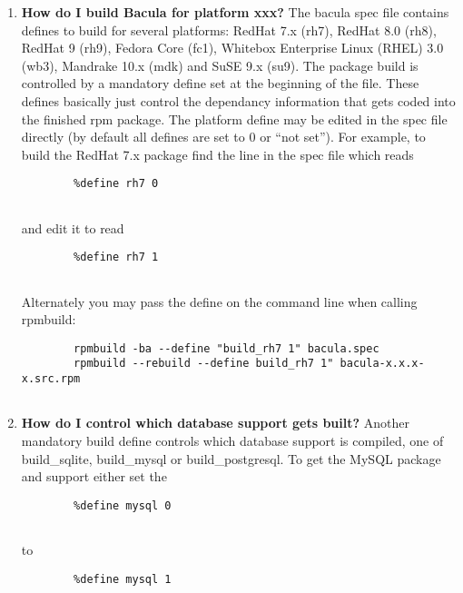\begin{enumerate}
\item 
   \label{faq1}
   {\bf How do I build Bacula for platform xxx?}
The bacula spec file contains defines to build for several platforms:  RedHat
7.x (rh7), RedHat 8.0 (rh8), RedHat 9 (rh9), Fedora Core (fc1),  Whitebox
Enterprise Linux (RHEL) 3.0 (wb3), Mandrake 10.x (mdk) and SuSE 9.x (su9). 
The package build is controlled by a mandatory define set at the beginning of 
the file. These defines basically just control the dependancy information that
 gets coded into the finished rpm package. 
The platform define may be edited in the spec file directly (by default all 
defines are set to 0 or ``not set''). For example, to build the RedHat 7.x 
package find the line in the spec file which reads  

\footnotesize
\begin{verbatim}
        %define rh7 0
        
\end{verbatim}
\normalsize

and edit it to read  

\footnotesize
\begin{verbatim}
        %define rh7 1
        
\end{verbatim}
\normalsize

Alternately you may pass the define on the command line when calling rpmbuild:
 

\footnotesize
\begin{verbatim}
        rpmbuild -ba --define "build_rh7 1" bacula.spec
        rpmbuild --rebuild --define build_rh7 1" bacula-x.x.x-x.src.rpm
        
\end{verbatim}
\normalsize

\item 
   \label{faq2}
   {\bf How do I control which database support gets built?}
Another mandatory build define controls which database support is compiled,
one of  build\_sqlite, build\_mysql or build\_postgresql. To get the MySQL
package and support either  set the  

\footnotesize
\begin{verbatim}
        %define mysql 0
        
\end{verbatim}
\normalsize

to  

\footnotesize
\begin{verbatim}
        %define mysql 1
        

\end{verbatim}
\end{enumerate}
